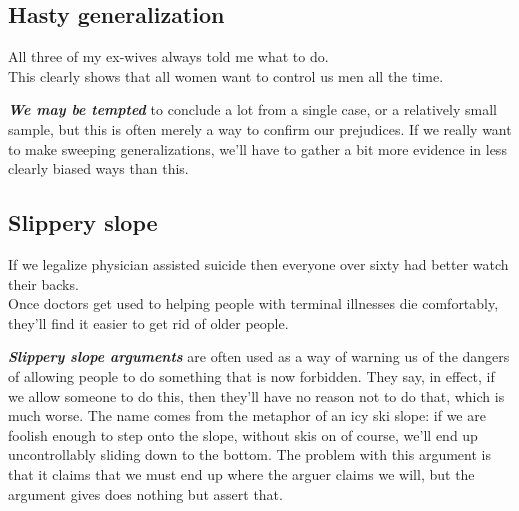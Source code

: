 \documentclass[12pt, openany]{book}
\begin{document}
\hypertarget{hasty-generalization}{%
\subsection*{Hasty generalization}\label{hasty-generalization}}


\begin{center}

\begin{argument}

All three of my ex-wives always told me what to do.\\

This clearly shows that all women want to control us men all the time.

\end{argument}

\end{center}

\textbf{\emph{We may be tempted}} to conclude a lot from a single case, or a relatively small sample, but this is often merely a way to confirm our prejudices. If we really want to make sweeping generalizations, we'll have to gather a bit more evidence in less clearly biased ways than this.

\hypertarget{slippery-slope}{%
\subsection*{Slippery slope}\label{slippery-slope}}


\begin{center}

\begin{argument}

If we legalize physician assisted suicide then everyone over sixty had better watch their backs.\\

Once doctors get used to helping people with terminal illnesses die comfortably, they'll find it easier to get rid of older people.

\end{argument}

\end{center}

\textbf{\emph{Slippery slope arguments}} are often used as a way of warning us of the dangers of allowing people to do something that is now forbidden. They say, in effect, if we allow someone to do this, then they'll have no reason not to do that, which is much worse. The name comes from the metaphor of an icy ski slope: if we are foolish enough to step onto the slope, without skis on of course, we'll end up uncontrollably sliding down to the bottom. The problem with this argument is that it claims that we must end up where the arguer claims we will, but the argument gives does nothing but assert that.
\end{document}
